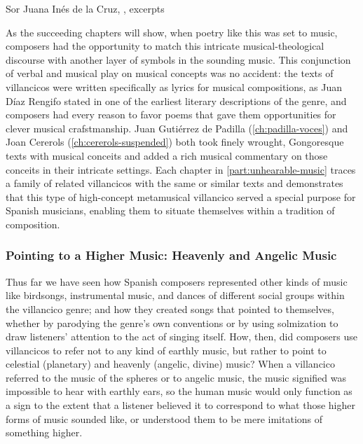 {Sor Juana Inés de la Cruz, ,
excerpts}

As the succeeding chapters will show, when poetry like this was set to music,
composers had the opportunity to match this intricate musical-theological
discourse with another layer of symbols in the sounding music.
This conjunction of verbal and musical play on musical concepts was no
accident: the texts of villancicos were written specifically as lyrics for
musical compositions, as Juan Díaz Rengifo stated in one of the earliest
literary descriptions of the genre, and composers had every reason to favor
poems that gave them opportunities for clever musical crafstmanship.%
    \Autocite{Rengifo:ArteMetrica}
Juan Gutiérrez de Padilla (\cref{ch:padilla-voces}) and Joan Cererols
(\cref{ch:cererols-suspended}) both took finely wrought, Gongoresque texts with
musical conceits and added a rich musical commentary on those conceits in their
intricate settings.
Each chapter in \cref{part:unhearable-music} traces a family of related
villancicos with the same or similar texts and demonstrates that this type of
high-concept metamusical villancico served a special purpose for Spanish
musicians, enabling them to situate themselves within a tradition of
composition.

\subsubsection{Pointing to a Higher Music: Heavenly and Angelic Music}

Thus far we have seen how Spanish composers represented other kinds of music
like birdsongs, instrumental music, and dances of different social groups
within the villancico genre; and how they created songs that pointed to
themselves, whether by parodying the genre's own conventions or by using
solmization to draw listeners' attention to the act of singing itself.
How, then, did composers use villancicos to refer not to any kind of earthly
music, but rather to point to celestial (planetary) and heavenly (angelic,
divine) music?
When a villancico referred to the music of the spheres or to angelic music, the
music signified was impossible to hear with earthly ears, so the human music
would only function as a sign to the extent that a listener believed it to
correspond to what those higher forms of music sounded like, or understood them
to be mere imitations of something higher.

